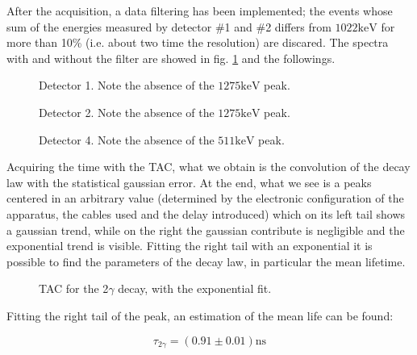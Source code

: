 \documentclass[11pt,a4 paper]{article}
\begin{document}
After the acquisition, a data filtering has been implemented; the events whose sum of the energies measured by detector \#1 and \#2 differs from $1022\si{\kilo\electronvolt}$ for more than 10\% (i.e. about two time the resolution) are discared. The spectra with and without the filter are showed in fig. \ref{fig:det1:2gamma} and the followings.

\begin{figure}[H]
    \centering
    \caption{Detector 1. Note the absence of the $1275\si{\kilo\electronvolt}$ peak.}
    \label{fig:det1:2gamma}
\end{figure}

\begin{figure}[H]
    \centering
    \caption{Detector 2. Note the absence of the $1275\si{\kilo\electronvolt}$ peak.}
    \label{fig:det2:2gamma}
\end{figure}

\begin{figure}[H]
    \centering
    \caption{Detector 4. Note the absence of the $511\si{\kilo\electronvolt}$ peak.}
    \label{fig:det4:2gamma}
\end{figure}

Acquiring the time with the TAC, what we obtain is the convolution of the decay law with the statistical gaussian error. At the end, what we see is a peaks centered in an arbitrary value (determined by the electronic configuration of the apparatus, the cables used and the delay introduced) which on its left tail shows a gaussian trend, while on the right the gaussian contribute is negligible and the exponential trend is visible. Fitting the right tail with an exponential it is possible to find the parameters of the decay law, in particular the mean lifetime.

\begin{figure}[H]
    \centering
    \caption{TAC for the 2$\gamma$ decay, with the exponential fit.}
    \label{fig:tac:2gamma}
\end{figure}

Fitting the right tail of the peak, an estimation of the mean life can be found:

\begin{equation*}
    \tau_{2\gamma} = ( 0.91 \pm 0.01) \si{\nano\second}
\end{equation*}
\end{document}
